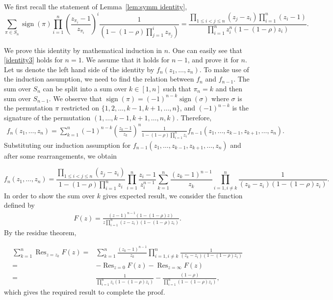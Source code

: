 \documentclass[cmp]{svjour}
\numberwithin{theorem}{section}
\numberwithin{equation}{section}
\DeclareMathOperator{\sign}{sign}
\DeclareMathOperator{\res}{Res}
\begin{document}
We first recall the statement of Lemma~\ref{lem:symm identity},
\begin{equation}
\label{identity3}
\sum_{\pi\in S_n}\sign(\pi)\prod_{i=1}^n
\left(\frac{z_{\pi_i}-1}{z_{\pi_i}}\right)^i
\frac{1}{(1-(1-\rho)\prod_{j=1}^i z_{\pi_j})}
=
\frac{\prod_{1 \leq i<j \leq n}(z_j-z_i)
\prod_{i=1}^{n}(z_i-1)}
{\prod_{i=1}^{n}z_i^n(1-(1-\rho)z_i)}.
\end{equation}

We prove this identity by mathematical induction in $n$. One can easily see that \eqref{identity3} holds for $n=1$. We assume that it holds for $n-1$, and prove it for $n$. Let us denote the left hand side of the identity by $f_n(z_1,\dots,z_n)$. To make use of the induction assumption, we need to find the relation between $f_n$ and $f_{n-1}$. The sum over $S_n$ can be split into a sum over $k \in [1, n]$ such that $\pi_n=k$ and then sum over $S_{n-1}$. We observe that $\sign(\pi)=(-1)^{n-k}\sign(\sigma)$ where $\sigma$ is the permutation $\pi$ restricted on $\{1,2,\dots,k-1,k+1,\dots,n\}$, and $(-1)^{n-k}$ is the signature of the permutation $(1,\dots,k-1,k+1,\dots,n,k)$. Therefore,
\begin{align*}
f_n(z_1,\dots,z_n)
=
\sum_{k=1}^n(-1)^{n-k}
\left(\frac{z_k-1}{z_k}\right)^n
\frac{1}{1-(1-\rho)\prod_{i=1}^nz_{i}}
f_{n-1}(z_1,\dots,z_{k-1},z_{k+1},\dots,z_n).
\end{align*}
Substituting our induction assumption for $f_{n-1}(z_1,\dots,z_{k-1},z_{k+1},\dots,z_n)$ and after some rearrangements, we obtain



\begin{equation*}
f_n(z_1,\dots,z_n)
=
\frac{\prod_{1 \leq i<j \leq n}(z_j-z_i)}
{1-(1-\rho)\prod_{i=1}^nz_i}
\prod_{i=1}^n
\frac{z_i-1}{z_i^{n-1}}
\sum_{k=1}^n
\frac{(z_k-1)^{n-1}}{z_k}
\prod_{i = 1, i\neq k}^{n}
\frac{1}{(z_k-z_i)(1-(1-\rho)z_i)}.
\end{equation*}
In order to show the sum over $k$ gives expected result, we consider the function defined by
\begin{align*}
F(z)
=
\frac{(z-1)^{n-1}(1-(1-\rho)z)}
{z\prod_{i=1}^n(z-z_i)(1-(1-\rho)z_i)}.
\end{align*}
By the residue theorem,


\begin{align*}
\sum_{k=1}^{n}\res_{z=z_k}F(z)
=&
\sum_{k=1}^n
\frac{(z_k-1)^{n-1}}{z_k}
\prod_{i=1,i\neq k}^{n}
\frac{1}{(z_k-z_i)(1-(1-\rho)z_i)}
\\
=&
-\res_{z=0}F(z) - \res_{z=\infty}F(z)
\\
=&
\frac{1}
{\prod_{i=1}^nz_i(1-(1-\rho)z_i)}
-
\frac{(1-\rho)}
{\prod_{i=1}^n(1-(1-\rho)z_i)},
\end{align*}
which gives the required result to complete the proof. 
\end{document}

